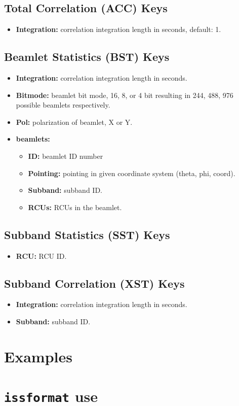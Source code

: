 \documentclass[10pt,a4paper]{article}
\begin{document}
\subsection{Total Correlation (ACC) Keys}

\begin{itemize}
    \item \textbf{Integration:} correlation integration length in seconds,
    default: 1.
\end{itemize}

\subsection{Beamlet Statistics (BST) Keys}

\begin{itemize}
    \item \textbf{Integration:} correlation integration length in seconds.
    \item \textbf{Bitmode:} beamlet bit mode, 16, 8, or 4 bit resulting in 244,
    488, 976 possible beamlets respectively.
    \item \textbf{Pol:} polarization of beamlet, X or Y.
    \item \textbf{beamlets:}
    \begin{itemize}
        \item \textbf{ID:} beamlet ID number
        \item \textbf{Pointing:} pointing in given coordinate system (theta,
        phi, coord).
        \item \textbf{Subband:} subband ID.
        \item \textbf{RCUs:} RCUs in the beamlet.
    \end{itemize}

\end{itemize}

\subsection{Subband Statistics (SST) Keys}

\begin{itemize}
    \item \textbf{RCU:} RCU ID.
\end{itemize}

\subsection{Subband Correlation (XST) Keys}

\begin{itemize}
    \item \textbf{Integration:} correlation integration length in seconds.
    \item \textbf{Subband:} subband ID.
\end{itemize}

\section{Examples}

\section{\texttt{issformat} use}
\end{document}
